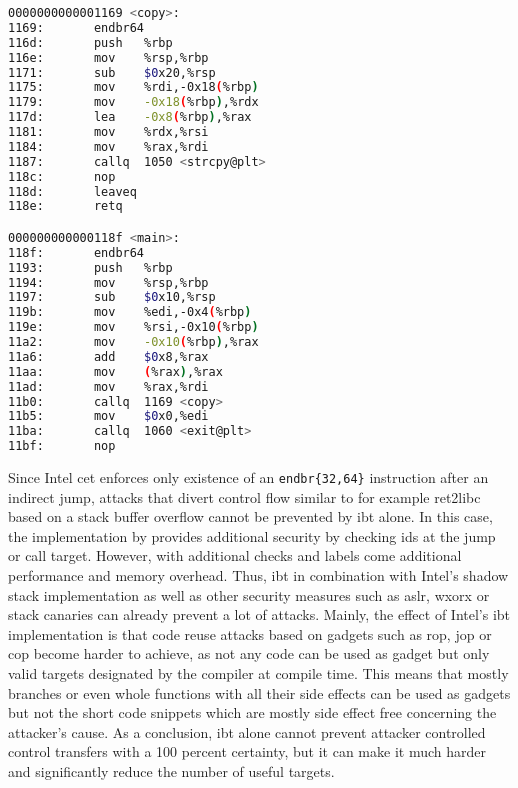 \begin{lstlisting}[language=bash,float=ht,caption={Disassembly excerpt of the 64 bit binary compiled from the code in \cref{lst:optimization} with \texttt{gcc -o copy optimization.c -fno-stack-protector -fcf-protection=full}, retrieved with \texttt{objdump -D -{}-no-show-raw-\linebreak[0]insn copy} (cf. \cref{lst:optimization-disassembly} compiled without \acs{ibt} support)}, label={lst:optimization-disassembly-ibt}]
0000000000001169 <copy>:
1169:       endbr64
116d:       push   %rbp
116e:       mov    %rsp,%rbp
1171:       sub    $0x20,%rsp
1175:       mov    %rdi,-0x18(%rbp)
1179:       mov    -0x18(%rbp),%rdx
117d:       lea    -0x8(%rbp),%rax
1181:       mov    %rdx,%rsi
1184:       mov    %rax,%rdi
1187:       callq  1050 <strcpy@plt>
118c:       nop
118d:       leaveq
118e:       retq

000000000000118f <main>:
118f:       endbr64
1193:       push   %rbp
1194:       mov    %rsp,%rbp
1197:       sub    $0x10,%rsp
119b:       mov    %edi,-0x4(%rbp)
119e:       mov    %rsi,-0x10(%rbp)
11a2:       mov    -0x10(%rbp),%rax
11a6:       add    $0x8,%rax
11aa:       mov    (%rax),%rax
11ad:       mov    %rax,%rdi
11b0:       callq  1169 <copy>
11b5:       mov    $0x0,%edi
11ba:       callq  1060 <exit@plt>
11bf:       nop
\end{lstlisting}

Since Intel \gls{cet} enforces only existence of an \texttt{endbr\{32,64\}} instruction after an indirect jump, attacks that divert control flow similar to for example \gls{ret2libc} based on a stack buffer overflow cannot be prevented by \gls{ibt} alone.
In this case, the implementation by \citeauthor{Abadi2005} provides additional security by checking \glspl{id} at the jump or call target.
However, with additional checks and labels come additional performance and memory overhead.
Thus, \gls{ibt} in combination with Intel's shadow stack implementation as well as other security measures such as \gls{aslr}, \gls{wxorx} or stack canaries can already prevent a lot of attacks.
Mainly, the effect of Intel's \gls{ibt} implementation is that code reuse attacks based on gadgets such as \gls{rop}, \gls{jop} or \gls{cop} become harder to achieve, as not any code can be used as gadget but only valid targets designated by the compiler at compile time.
This means that mostly branches or even whole functions with all their side effects can be used as gadgets but not the short code snippets which are mostly side effect free concerning the attacker's cause.
As a conclusion, \gls{ibt} alone cannot prevent attacker controlled control transfers with a 100 percent certainty, but it can make it much harder and significantly reduce the number of useful targets.

